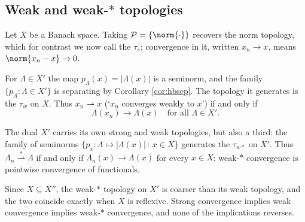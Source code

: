 \documentclass[a4paper]{scrartcl}
\newcommand{\weakto}{\rightharpoonup}
\newcommand{\wsto}{\overset{*}{\rightharpoonup}}
\begin{document}
\subsection{Weak and weak-\texorpdfstring{$*$}{*} topologies}

Let $X$ be a Banach space. Taking $\mathcal{P} = \{\norm{\cdot}\}$ recovers the norm topology, which for contrast we now call the  $\tau_s$; convergence in it, written $x_n \to x$, means $\norm{x_n - x}\to 0$.

\begin{definition}
	For $\Lambda \in X'$ the map $p_\Lambda(x) = |\Lambda(x)|$ is a seminorm, and the family $\{p_\Lambda : \Lambda \in X'\}$ is separating by Corollary \ref{cor:hbsep}. The topology it generates is the  $\tau_w$ on $X$. Thus $x_n \weakto x$ (`$x_n$ converges weakly to $x$') if and only if
	$$\Lambda(x_n) \to \Lambda(x) \quad \text{for all } \Lambda \in X'.$$
\end{definition}

\begin{definition}
	The dual $X'$ carries its own strong and weak topologies, but also a third: the family of seminorms $\{p_x : \Lambda \mapsto |\Lambda(x)| \, : \, x \in X\}$ generates the  $\tau_{w*}$ on $X'$. Thus $\Lambda_n \wsto \Lambda$ if and only if $\Lambda_n(x) \to \Lambda(x)$ for every $x \in X$: weak-$*$ convergence is pointwise convergence of functionals.
\end{definition}

Since $X \subseteq X''$, the weak-$*$ topology on $X'$ is coarser than its weak topology, and the two coincide exactly when $X$ is reflexive. Strong convergence implies weak convergence implies weak-$*$ convergence, and none of the implications reverses.
\end{document}
